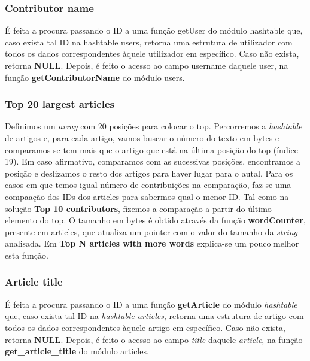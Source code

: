 \documentclass[a4paper]{article}
\begin{document}
\subsubsection{Contributor name}
É feita a procura passando o ID a uma função getUser do módulo hashtable que, caso exista tal ID na hashtable users, retorna uma estrutura de utilizador com todos os dados correspondentes àquele utilizador em específico. Caso não exista, retorna \textbf{NULL}. Depois, é feito o acesso ao campo username daquele user, na função \textbf{getContributorName} do módulo users.

\subsubsection{Top 20 largest articles}
Definimos um \textit{array} com 20 posições para colocar o top. Percorremos a \textit{hashtable} de artigos e, para cada artigo, vamos buscar o número do texto em bytes e comparamos se tem mais que o artigo que está na última posição do top (índice 19). Em caso afirmativo, comparamos com as sucessivas posições, encontramos a posição e deslizamos o resto dos artigos para haver lugar para o autal. Para os casos em que temos igual número de contribuições na comparação, faz-se uma compaação dos IDs dos articles para sabermos qual o menor ID.
Tal como na solução \textbf{Top 10 contributors}, fizemos a comparação a partir do último elemento do top.
O tamanho em bytes é obtido através da função \textbf{wordCounter}, presente em articles, que atualiza um pointer com o valor do tamanho da \textit{string} analisada. Em \textbf{Top N articles with more words} explica-se um pouco melhor esta função.

\subsubsection{Article title}
É feita a procura passando o ID a uma função \textbf{getArticle} do módulo \textit{hashtable} que, caso exista tal ID na \textit{hashtable articles}, retorna uma estrutura de artigo com todos os dados correspondentes àquele artigo em específico. Caso não exista, retorna \textbf{NULL}. Depois, é feito o acesso ao campo \textit{title} daquele \textit{article}, na função \textbf{get_article_title} do módulo articles.
\end{document}
